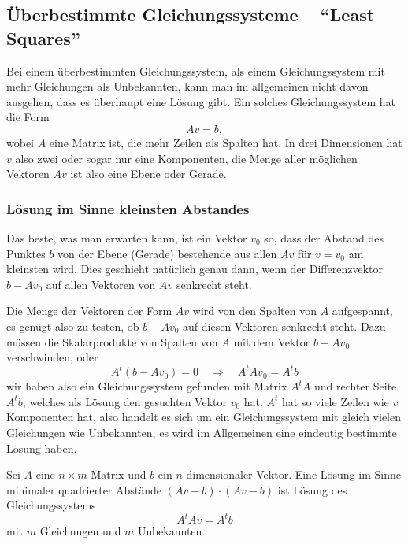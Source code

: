 \subsection{Überbestimmte Gleichungssysteme -- ``Least Squares''\label{section-least-squares}}
Bei einem überbestimmten Gleichungssystem, als einem Gleichungssystem
mit mehr Gleichungen als Unbekannten, kann man im allgemeinen nicht davon
ausgehen, dass es überhaupt eine Lösung gibt.
Ein solches Gleichungssystem hat die Form
\[
A v= b,
\]
wobei $A$ eine Matrix ist, die mehr Zeilen als Spalten hat.
In drei Dimensionen hat $v$ also zwei oder sogar nur eine Komponenten,
die Menge aller möglichen Vektoren $Av$ ist also eine Ebene oder
Gerade.

\subsubsection{Lösung im Sinne kleinsten Abstandes}
Das beste, was man erwarten kann, ist ein Vektor $v_0$ so, dass
der Abstand des Punktes $ b$ von der Ebene (Gerade) bestehende
aus allen $Av$ für $v=v_0$ am kleinsten wird.
Dies geschieht
natürlich genau dann, wenn der Differenzvektor $b-Av_0$ auf
allen Vektoren von $Av$ senkrecht steht.

Die Menge der Vektoren der Form $Av$ wird von den Spalten von $A$
aufgespannt, es genügt also zu testen, ob $b-Av_0$ auf diesen
Vektoren senkrecht steht.
Dazu müssen die Skalarprodukte von
Spalten von $A$ mit dem Vektor $b-Av_0$ verschwinden, oder
\[
A^t(b-Av_0)=0
\quad
\Rightarrow
\quad
A^tAv_0=A^tb
\]
wir haben also ein Gleichungssystem gefunden mit Matrix $A^tA$ und
rechter Seite $A^tb$, welches als Lösung den gesuchten Vektor
$v_0$ hat.
$A^t$ hat so viele Zeilen wie $v$ Komponenten hat, also
handelt es sich um ein Gleichungssystem mit gleich vielen Gleichungen
wie Unbekannten, es wird im Allgemeinen eine eindeutig bestimmte
Lösung haben.

\begin{satz} Sei $A$ eine $n\times m$ Matrix und $b$ ein $n$-dimensionaler
Vektor.
Eine Lösung im Sinne minimaler quadrierter Abstände
$
(Av-b)\cdot(Av-b)
$
ist Lösung des Gleichungssystems
\[
A^tAv=A^tb
\]
mit $m$ Gleichungen und $m$ Unbekannten.
\end{satz}

